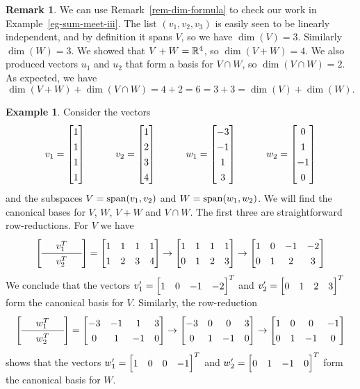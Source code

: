 \documentclass[reqno]{amsart}
\theoremstyle{definition}
\newtheorem{remark}[theorem]{Remark}
\newtheorem{example}[theorem]{Example}
\begin{document}
\begin{remark}
 We can use Remark~\ref{rem-dim-formula} to check our work in
 Example~\ref{eg-sum-meet-iii}.  The list $(v_1,v_2,v_3)$ is easily seen
 to be linearly independent, and by definition it spans $V$, so we
 have $\dim(V)=3$.  Similarly $\dim(W)=3$.  We showed that $V+W={\mathbb{R}}^4$,
 so $\dim(V+W)=4$.  We also produced vectors $u_1$ and $u_2$ that
 form a basis for $V\cap W$, so $\dim(V\cap W)=2$.  As expected, we
 have
 \[ \dim(V+W)+\dim(V\cap W) = 4+2 = 6 = 3+3 = \dim(V)+\dim(W). \]
\end{remark}

\begin{example}\label{eg-sum-meet-iv}
 Consider the vectors
 \[ v_1 = \bbm  1 \\  1 \\  1 \\  1 \ebm \hspace{3em}
    v_2 = \bbm  1 \\  2 \\  3 \\  4 \ebm \hspace{3em}
    w_1 = \bbm -3 \\ -1 \\  1 \\  3 \ebm \hspace{3em}
    w_2 = \bbm  0 \\  1 \\ -1 \\  0 \ebm
 \]
 and the subspaces $V=\operatorname{span}(v_1,v_2)$ and $W=\operatorname{span}(w_1,w_2)$.
 We will find the canonical bases for $V$, $W$, $V+W$ and $V\cap W$.
 The first three are straightforward row-reductions.  For $V$ we have
 \[ {\renewcommand{\arraystretch}{1.3}
  \left[\begin{array}{ccc}
   &v_1^T& \\ \hline &v_2^T&
  \end{array}\right]}
  =
  \bbm
   1 & 1 & 1 & 1 \\
   1 & 2 & 3 & 4
  \ebm
  \to
  \bbm
   1 & 1 & 1 & 1 \\
   0 & 1 & 2 & 3
  \ebm
  \to
  \bbm
   1 & 0 &-1 &-2 \\
   0 & 1 & 2 & 3
  \ebm
 \]
 We conclude that the vectors $v'_1=\bbm 1&0&-1&-2\ebm^T$ and
 $v'_2=\bbm 0&1&2&3\ebm^T$ form the canonical basis for $V$.
 Similarly, the row-reduction
 \[ {\renewcommand{\arraystretch}{1.3}
  \left[\begin{array}{ccc}
   &w_1^T& \\ \hline &w_2^T&
  \end{array}\right]}
  =
  \bbm
   -3&-1 & 1 & 3 \\
   0 & 1 &-1 & 0
  \ebm
  \to
  \bbm
   -3& 0 & 0 & 3 \\
   0 & 1 &-1 & 0
  \ebm
  \to
  \bbm
   1 & 0 & 0 &-1 \\
   0 & 1 &-1 & 0
  \ebm
 \]
 shows that the vectors $w'_1=\bbm 1&0&0&-1\ebm^T$ and
 $w'_2=\bbm 0&1&-1&0\ebm^T$ form the canonical basis for $W$.


\end{example}
\end{document}
